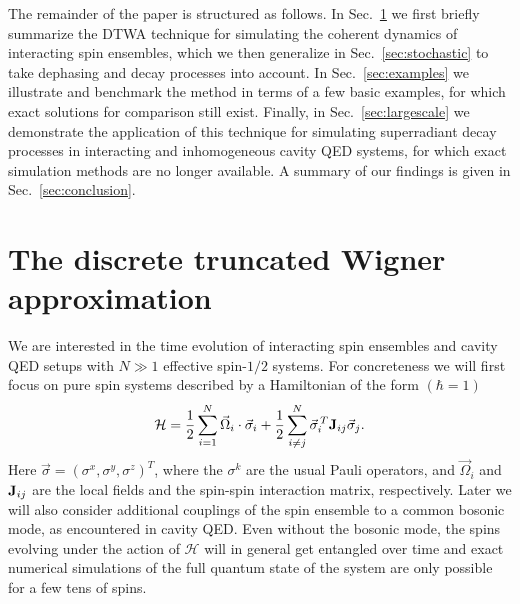 \documentclass[pra,twocolumn,showpacs,preprintnumbers,amsmath,amssymb,superscriptaddress]{revtex4-1}
\begin{document}
The remainder of the paper is structured as follows. In Sec.~\ref{sec:DTWA} we first briefly summarize the DTWA technique for simulating the coherent dynamics of interacting spin ensembles, which we then generalize in Sec.~\ref{sec:stochastic} to take dephasing and decay processes into account. In Sec.~\ref{sec:examples} we illustrate and benchmark the method in terms of a few basic examples, for which exact solutions for comparison still exist. Finally, in Sec.~\ref{sec:largescale} we demonstrate the application of this technique for simulating superradiant decay processes in interacting and inhomogeneous cavity QED systems, for which exact simulation methods are no longer available. A summary of our findings is given in Sec.~\ref{sec:conclusion}. 


\section{The discrete truncated Wigner approximation}\label{sec:DTWA}
We are interested in the time evolution of interacting spin ensembles and cavity QED setups with $N\gg1$ effective spin-$1/2$ systems. For concreteness we will first focus on  
pure spin systems described by a Hamiltonian of the form $(\hbar=1)$
\begin{equation}
\mathcal{H}= \frac{1}{2}\sum_{i=1}^N \vec \Omega_i\cdot  \vec \sigma_i + \frac{1}{2} \sum_{i\neq j}^N \vec \sigma_i^{\,T} {\bf J}_{ij} \vec \sigma_j.
\label{eq:spinham}
\end{equation}
Here $\vec \sigma=(\sigma^x,\sigma^y,\sigma^z)^T$, where the $\sigma^k$ are the usual Pauli operators, and $\vec \Omega_i$ and  ${\bf J}_{ij}$ are the local fields and the spin-spin interaction matrix, respectively. Later we will also consider additional couplings of the spin ensemble to a common bosonic mode, as encountered in cavity QED.  Even without the bosonic mode, 
the spins evolving under the action of $\mathcal{H}$ will in general get entangled over time and exact numerical simulations of the full quantum state of the system are only possible for a few tens of spins.  
\end{document}

